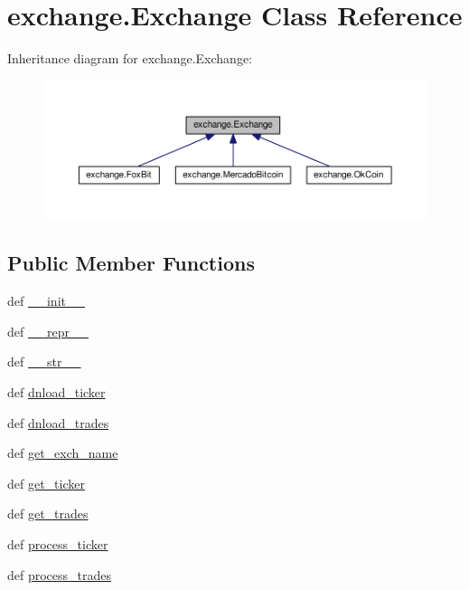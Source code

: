 \hypertarget{classexchange_1_1_exchange}{\section{exchange.\-Exchange Class Reference}
\label{classexchange_1_1_exchange}
}


Inheritance diagram for exchange.\-Exchange\-:
\nopagebreak
\begin{figure}[H]
\begin{center}
\leavevmode
\includegraphics[width=350pt]{classexchange_1_1_exchange__inherit__graph}
\end{center}
\end{figure}
\subsection*{Public Member Functions}
\begin{DoxyCompactItemize}
\item 
def \hyperlink{classexchange_1_1_exchange_a75e4957e085558959dc606fcc7cca55d}{\-\_\-\-\_\-init\-\_\-\-\_\-}
\item 
def \hyperlink{classexchange_1_1_exchange_a0ad3ad8c4feaabd714bd93ad5c7e9ffd}{\-\_\-\-\_\-repr\-\_\-\-\_\-}
\item 
def \hyperlink{classexchange_1_1_exchange_a24c728f6cb4700a285bae3cf902580ee}{\-\_\-\-\_\-str\-\_\-\-\_\-}
\item 
def \hyperlink{classexchange_1_1_exchange_a617fe5e236e61725b62f0865eb3cb613}{dnload\-\_\-ticker}
\item 
def \hyperlink{classexchange_1_1_exchange_a89a7e4ad373dfcf9686f9f87404e464f}{dnload\-\_\-trades}
\item 
def \hyperlink{classexchange_1_1_exchange_a0db59994432848ffdf942dce8b82369b}{get\-\_\-exch\-\_\-name}
\item 
def \hyperlink{classexchange_1_1_exchange_acd7e3233946da3b9d452f9505cd58033}{get\-\_\-ticker}
\item 
def \hyperlink{classexchange_1_1_exchange_a522c44739df2164c6e8e9457516645e5}{get\-\_\-trades}
\item 
def \hyperlink{classexchange_1_1_exchange_a8243e9912c623049658aabc30b72b55a}{process\-\_\-ticker}
\item 
def \hyperlink{classexchange_1_1_exchange_a182c849cfda71ffb325d1dc54bb29f5d}{process\-\_\-trades}
\end{DoxyCompactItemize}
